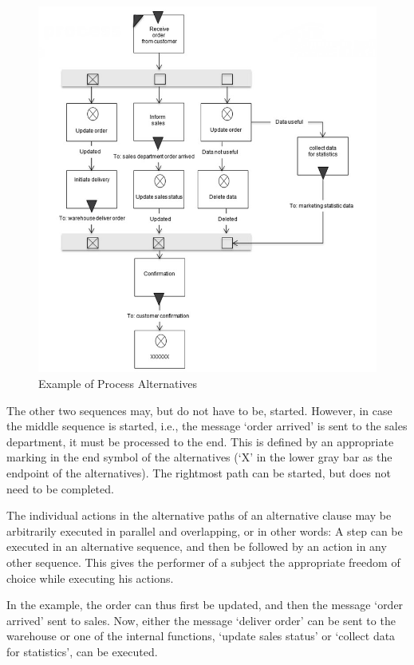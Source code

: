 \begin{figure}[h!]
	\centering
	\includegraphics[width=0.7\linewidth]{20181026-Ontologie-Bilder/Grafiken-Ontologie/SUbjectExecution/ALternative}
	\caption[Example of Process Alternatives]{Example of Process Alternatives}
	\label{fig:alternative}
\end{figure}

The other two sequences may, but do not have to be, started. However, in case the middle sequence is started, i.e., the message ‘order arrived’ is sent to the sales department, it must be processed to the end. This is defined by an appropriate marking in the end symbol of the alternatives (‘X’ in the lower gray bar as the endpoint of the alternatives). The rightmost path can be started, but does not need to be completed.

The individual actions in the alternative paths of an alternative clause may be arbitrarily executed in parallel and overlapping, or in other words: A step can be executed in an alternative sequence, and then be followed by an action in any other sequence. This gives the performer of a subject the appropriate freedom of choice while executing his actions.

In the example, the order can thus first be updated, and then the message ‘order arrived’ sent to sales. Now, either the message ‘deliver order’ can be sent to the warehouse or one of the internal functions, ‘update sales status’ or ‘collect data for statistics’, can be executed.

